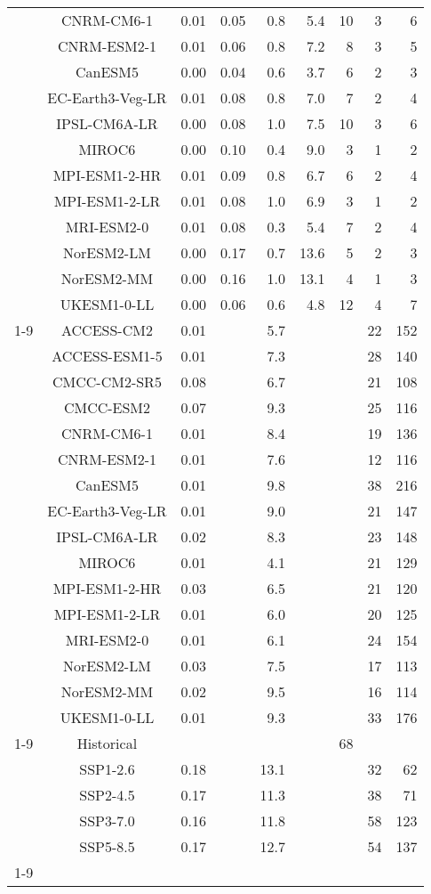 \begin{table*}[t]
\begin{tabular}{c|c|rr|rr|rrr}
 & CNRM-CM6-1 & 0.01 & 0.05 & 0.8 & 5.4 & 10 & 3 & 6 \\
 & CNRM-ESM2-1 & 0.01 & 0.06 & 0.8 & 7.2 & 8 & 3 & 5 \\
 & CanESM5 & 0.00 & 0.04 & 0.6 & 3.7 & 6 & 2 & 3 \\
 & EC-Earth3-Veg-LR & 0.01 & 0.08 & 0.8 & 7.0 & 7 & 2 & 4 \\
 & IPSL-CM6A-LR & 0.00 & 0.08 & 1.0 & 7.5 & 10 & 3 & 6 \\
 & MIROC6 & 0.00 & 0.10 & 0.4 & 9.0 & 3 & 1 & 2 \\
 & MPI-ESM1-2-HR & 0.01 & 0.09 & 0.8 & 6.7 & 6 & 2 & 4 \\
 & MPI-ESM1-2-LR & 0.01 & 0.08 & 1.0 & 6.9 & 3 & 1 & 2 \\
 & MRI-ESM2-0 & 0.01 & 0.08 & 0.3 & 5.4 & 7 & 2 & 4 \\
 & NorESM2-LM & 0.00 & 0.17 & 0.7 & 13.6 & 5 & 2 & 3 \\
 & NorESM2-MM & 0.00 & 0.16 & 1.0 & 13.1 & 4 & 1 & 3 \\
 & UKESM1-0-LL & 0.00 & 0.06 & 0.6 & 4.8 & 12 & 4 & 7 \\
\cline{1-9}
\multirow[c]{16}{*}{Scenario uncertainty} & ACCESS-CM2 & 0.01 &  & 5.7 &  &  & 22 & 152 \\
 & ACCESS-ESM1-5 & 0.01 &  & 7.3 &  &  & 28 & 140 \\
 & CMCC-CM2-SR5 & 0.08 &  & 6.7 &  &  & 21 & 108 \\
 & CMCC-ESM2 & 0.07 &  & 9.3 &  &  & 25 & 116 \\
 & CNRM-CM6-1 & 0.01 &  & 8.4 &  &  & 19 & 136 \\
 & CNRM-ESM2-1 & 0.01 &  & 7.6 &  &  & 12 & 116 \\
 & CanESM5 & 0.01 &  & 9.8 &  &  & 38 & 216 \\
 & EC-Earth3-Veg-LR & 0.01 &  & 9.0 &  &  & 21 & 147 \\
 & IPSL-CM6A-LR & 0.02 &  & 8.3 &  &  & 23 & 148 \\
 & MIROC6 & 0.01 &  & 4.1 &  &  & 21 & 129 \\
 & MPI-ESM1-2-HR & 0.03 &  & 6.5 &  &  & 21 & 120 \\
 & MPI-ESM1-2-LR & 0.01 &  & 6.0 &  &  & 20 & 125 \\
 & MRI-ESM2-0 & 0.01 &  & 6.1 &  &  & 24 & 154 \\
 & NorESM2-LM & 0.03 &  & 7.5 &  &  & 17 & 113 \\
 & NorESM2-MM & 0.02 &  & 9.5 &  &  & 16 & 114 \\
 & UKESM1-0-LL & 0.01 &  & 9.3 &  &  & 33 & 176 \\
\cline{1-9}
\multirow[c]{5}{*}{Model uncertainty} & Historical &  &  &  &  & 68 &  &  \\
 & SSP1-2.6 & 0.18 &  & 13.1 &  &  & 32 & 62 \\
 & SSP2-4.5 & 0.17 &  & 11.3 &  &  & 38 & 71 \\
 & SSP3-7.0 & 0.16 &  & 11.8 &  &  & 58 & 123 \\
 & SSP5-8.5 & 0.17 &  & 12.7 &  &  & 54 & 137 \\
\cline{1-9}
\bottomrule
\end{tabular}
\end{table*}
